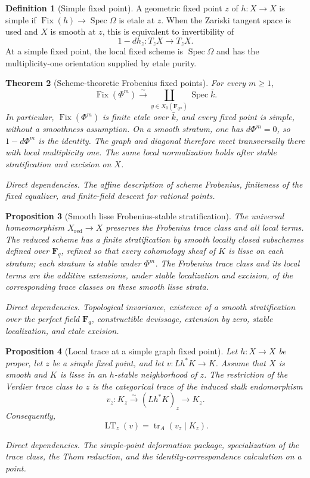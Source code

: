 \documentclass[10pt]{article}
\newtheorem{theorem}{Theorem}[section]
\newtheorem{proposition}[theorem]{Proposition}
\theoremstyle{definition}
\newtheorem{definition}[theorem]{Definition}
\newcommand{\Fq}{\mathbf F_q}
\newcommand{\Spec}{\operatorname{Spec}}
\newcommand{\Fix}{\operatorname{Fix}}
\newcommand{\depends}[1]{\par\smallskip\noindent\textit{Direct dependencies.} #1\par}
\begin{document}
\begin{definition}[Simple fixed point]
A geometric fixed point \(z\) of \(h:X\to X\) is simple if
\(\Fix(h)\to\Spec\Omega\) is etale at \(z\).  When the Zariski tangent
space is used and \(X\) is smooth at \(z\), this is equivalent to
invertibility of
\[
 1-dh_z:T_zX\longrightarrow T_zX.
\]
At a simple fixed point, the local fixed scheme is \(\Spec\Omega\) and has
the multiplicity-one orientation supplied by etale purity.
\end{definition}

\begin{theorem}[Scheme-theoretic Frobenius fixed points]
For every \(m\geq1\),
\[
 \Fix(\Phi^m)\xrightarrow{\sim}
 \coprod_{y\in X_0(\mathbf F_{q^m})}\Spec\bar k.
\]
In particular, \(\Fix(\Phi^m)\) is finite etale over \(\bar k\), and every
fixed point is simple, without a smoothness assumption.  On a smooth stratum,
one has \(d\Phi^m=0\), so \(1-d\Phi^m\) is the identity.  The graph and
diagonal therefore meet transversally there with local multiplicity one.  The
same local normalization holds after stable stratification and excision on
\(X\).
\depends{The affine description of scheme Frobenius, finiteness of the
fixed equalizer, and finite-field descent for rational points.}
\end{theorem}

\begin{proposition}[Smooth lisse Frobenius-stable stratification]
The universal homeomorphism \(X_{\mathrm{red}}\to X\) preserves the
Frobenius trace class and all local terms.  The reduced scheme has a finite
stratification by smooth locally closed subschemes defined over \(\Fq\),
refined so that every cohomology sheaf of \(K\) is lisse on each stratum;
each stratum is stable under \(\Phi^m\).  The Frobenius trace class and its
local terms are the additive extensions, under stable localization and
excision, of the corresponding trace classes on these smooth lisse strata.
\depends{Topological invariance, existence of a smooth stratification over
the perfect field \(\Fq\), constructible devissage, extension by zero,
stable localization, and etale excision.}
\end{proposition}

\begin{proposition}[Local trace at a simple graph fixed point]
Let \(h:X\to X\) be proper, let \(z\) be a simple fixed point, and let
\(v:Lh^*K\to K\).  Assume that \(X\) is smooth and \(K\) is lisse in an
\(h\)-stable neighborhood of \(z\).  The restriction of the Verdier trace
class to \(z\) is the categorical trace of the induced stalk endomorphism
\[
 v_z:K_z\xrightarrow{\sim}(Lh^*K)_z\longrightarrow K_z.
\]
Consequently,
\[
 \operatorname{LT}_z(v)=\operatorname{tr}_A(v_z\mid K_z).
\]
\depends{The simple-point deformation package, specialization of the trace
class, the Thom reduction, and the identity-correspondence calculation on a
point.}
\end{proposition}
\end{document}
